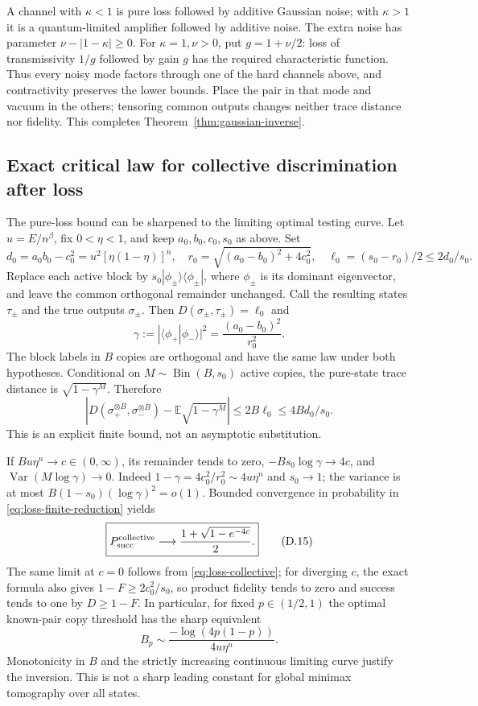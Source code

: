 \documentclass[11pt,a4paper]{article}
\numberwithin{equation}{section}
\begin{document}
A channel with $\kappa<1$ is pure loss followed by additive Gaussian noise;
with $\kappa>1$ it is a quantum-limited amplifier followed by additive noise.
The extra noise has parameter $\nu-|1-\kappa|\ge0$.
For $\kappa=1,\nu>0$, put $g=1+\nu/2$: loss of transmissivity $1/g$
followed by gain $g$ has the required characteristic function.
Thus every noisy mode factors through one of the hard channels above, and
contractivity preserves the lower bounds. Place the pair in that mode and
vacuum in the others; tensoring common outputs changes neither trace
distance nor fidelity. This completes Theorem~\ref{thm:gaussian-inverse}.

\subsection{Exact critical law for collective discrimination after loss}
The pure-loss bound can be sharpened to the limiting optimal testing curve.
Let $u=E/n^\beta$, fix $0<\eta<1$, and keep $a_0,b_0,c_0,s_0$ as above.
Set
\[
 d_0=a_0b_0-c_0^2=u^2[\eta(1-\eta)]^n,\quad
 r_0=\sqrt{(a_0-b_0)^2+4c_0^2},\quad
 \ell_0=(s_0-r_0)/2\le2d_0/s_0.
\]
Replace each active block by $s_0|\phi_\pm\rangle\langle\phi_\pm|$, where
$\phi_\pm$ is its dominant eigenvector, and leave the common orthogonal
remainder unchanged. Call the resulting states $\tau_\pm$ and the true
outputs $\sigma_\pm$. Then $D(\sigma_\pm,\tau_\pm)=\ell_0$ and
\[
 \gamma:=|\langle\phi_+|\phi_-\rangle|^2
                  =\frac{(a_0-b_0)^2}{r_0^2}.
\]
The block labels in $B$ copies are orthogonal and have the same law under
both hypotheses. Conditional on $M\sim\operatorname{Bin}(B,s_0)$ active
copies, the pure-state trace distance is $\sqrt{1-\gamma^M}$. Therefore
\[
 \left|D(\sigma_+^{\otimes B},\sigma_-^{\otimes B})
       -\mathbb E\sqrt{1-\gamma^M}\right|
                  \le2B\ell_0\le4Bd_0/s_0.
 \tag{D.14}\label{eq:loss-finite-reduction}
\]
This is an explicit finite bound, not an asymptotic substitution.

If $Bu\eta^n\to c\in(0,\infty)$, its remainder tends to zero,
$-Bs_0\log\gamma\to4c$, and
$\operatorname{Var}(M\log\gamma)\to0$.
Indeed $1-\gamma=4c_0^2/r_0^2\sim4u\eta^n$ and $s_0\to1$;
the variance is at most $B(1-s_0)(\log\gamma)^2=o(1)$.
Bounded convergence in probability in \eqref{eq:loss-finite-reduction} yields
\[
 \boxed{P_{\rm succ}^{\rm collective}\longrightarrow
                   \frac{1+\sqrt{1-e^{-4c}}}{2}.}
 \tag{D.15}\label{eq:loss-critical-law}
\]
The same limit at $c=0$ follows from \eqref{eq:loss-collective}; for diverging
$c$, the exact formula also gives $1-F\ge2c_0^2/s_0$, so product fidelity tends to zero
and success tends to one by $D\ge1-F$.
In particular, for fixed $p\in(1/2,1)$ the optimal known-pair copy threshold
has the sharp equivalent
\[
 B_p\sim\frac{-\log(4p(1-p))}{4u\eta^n}.
 \tag{D.16}\label{eq:loss-threshold}
\]
Monotonicity in $B$ and the strictly increasing continuous limiting curve
justify the inversion. This is not a sharp leading constant for global
minimax tomography over all states.
\end{document}
